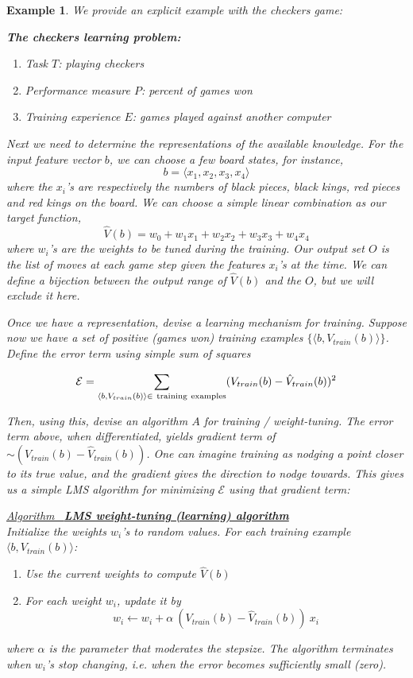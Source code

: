 \documentclass[12pt]{article}  %
\newtheorem{example}{Example}
\newcommand{\algtitle}[1]{\underline{Algorithm \ {\bf #1}} \vspace*{1mm}\\}
\begin{document}
\begin{example}
We provide an explicit example with the checkers game:

{\bf The checkers learning problem:}
\begin{enumerate}
\item Task $T$: playing checkers
\item Performance measure $P$: percent of games won
\item Training experience $E$: games played against another computer
\end{enumerate}

Next we need to determine the representations of the available knowledge. For the input feature vector $b$, we can choose a few board states, for instance, 
$$b = \langle x_1, x_2, x_3, x_4 \rangle$$
where the $x_i$'s are respectively the numbers of black pieces, black kings, red pieces and red kings on the board. We can choose a simple linear combination as our target function,
$$\hat{V}(b) = w_0 + w_1 x_1 + w_2 x_2 + w_3 x_3 + w_4 x_4$$
where $w_i$'s are the weights to be tuned during the training. Our output set $O$ is the list of moves at each game step given the features $x_i$'s at the time. We can define a bijection between the output range of $\hat{V}(b)$ and the $O$, but we will exclude it here.

Once we have a representation, devise a learning mechanism for training. Suppose now we have a set of positive (games won) training examples $\{\langle b, V_{train}(b) \rangle\}$. Define the error term using simple sum of squares

$$\mathcal{E} = \sum_{\langle b, V_{train}(b) \rangle \in \ {\rm training\ examples}} (V_{train}(b) - \hat{V}_{train}(b))^2$$

Then, using this, devise an algorithm $A$ for training / weight-tuning. The error term above, when differentiated, yields gradient term of $\sim(V_{train}(b) - \hat{V}_{train}(b))$. One can imagine training as nodging a point closer to its true value, and the gradient gives the direction to nodge towards. This gives us a simple LMS algorithm for minimizing $\mathcal{E}$ using that gradient term:


\algtitle{LMS weight-tuning (learning) algorithm}
Initialize the weights $w_i$'s to random values. For each training example $\langle b, V_{train}(b) \rangle$:
\begin{enumerate}
	\item Use the current weights to compute $\hat{V}(b)$
	\item For each weight $w_i$, update it by $$w_i \leftarrow w_i + \alpha \ (V_{train}(b) - \hat{V}_{train}(b)) \ x_i$$
\end{enumerate}

where $\alpha$ is the parameter that moderates the stepsize. The algorithm terminates when $w_i$'s stop changing, i.e. when the error becomes sufficiently small (zero).

\end{example}
\end{document}
